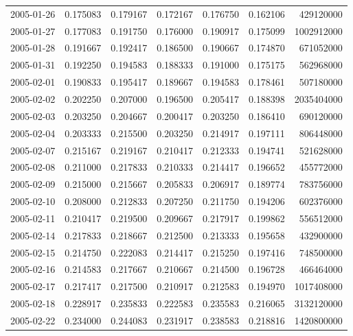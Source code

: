 \begin{tabular}{lrrrrrr}
2005-01-26 &    0.175083 &    0.179167 &    0.172167 &    0.176750 &    0.162106 &   429120000 \\
2005-01-27 &    0.177083 &    0.191750 &    0.176000 &    0.190917 &    0.175099 &  1002912000 \\
2005-01-28 &    0.191667 &    0.192417 &    0.186500 &    0.190667 &    0.174870 &   671052000 \\
2005-01-31 &    0.192250 &    0.194583 &    0.188333 &    0.191000 &    0.175175 &   562968000 \\
2005-02-01 &    0.190833 &    0.195417 &    0.189667 &    0.194583 &    0.178461 &   507180000 \\
2005-02-02 &    0.202250 &    0.207000 &    0.196500 &    0.205417 &    0.188398 &  2035404000 \\
2005-02-03 &    0.203250 &    0.204667 &    0.200417 &    0.203250 &    0.186410 &   690120000 \\
2005-02-04 &    0.203333 &    0.215500 &    0.203250 &    0.214917 &    0.197111 &   806448000 \\
2005-02-07 &    0.215167 &    0.219167 &    0.210417 &    0.212333 &    0.194741 &   521628000 \\
2005-02-08 &    0.211000 &    0.217833 &    0.210333 &    0.214417 &    0.196652 &   455772000 \\
2005-02-09 &    0.215000 &    0.215667 &    0.205833 &    0.206917 &    0.189774 &   783756000 \\
2005-02-10 &    0.208000 &    0.212833 &    0.207250 &    0.211750 &    0.194206 &   602376000 \\
2005-02-11 &    0.210417 &    0.219500 &    0.209667 &    0.217917 &    0.199862 &   556512000 \\
2005-02-14 &    0.217833 &    0.218667 &    0.212500 &    0.213333 &    0.195658 &   432900000 \\
2005-02-15 &    0.214750 &    0.222083 &    0.214417 &    0.215250 &    0.197416 &   748500000 \\
2005-02-16 &    0.214583 &    0.217667 &    0.210667 &    0.214500 &    0.196728 &   466464000 \\
2005-02-17 &    0.217417 &    0.217500 &    0.210917 &    0.212583 &    0.194970 &  1017408000 \\
2005-02-18 &    0.228917 &    0.235833 &    0.222583 &    0.235583 &    0.216065 &  3132120000 \\
2005-02-22 &    0.234000 &    0.244083 &    0.231917 &    0.238583 &    0.218816 &  1420800000 \\

\end{tabular}
